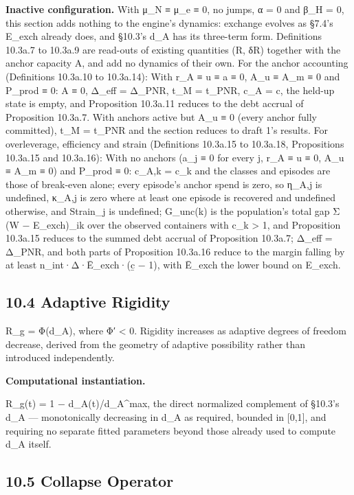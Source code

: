 \documentclass[
]{article}
\begin{document}
\textbf{Inactive configuration.} With μ\_N ≡ μ\_e ≡ 0, no jumps, α = 0
and β\_H = 0, this section adds nothing to the engine's dynamics:
exchange evolves as §7.4's E\_exch already does, and §10.3's d\_A has
its three-term form. Definitions 10.3a.7 to 10.3a.9 are read-outs of
existing quantities (R, δR) together with the anchor capacity A, and add
no dynamics of their own. For the anchor accounting (Definitions
10.3a.10 to 10.3a.14): With r\_A ≡ u ≡ a ≡ 0, A\_u ≡ A\_m ≡ 0 and
P\_prod ≡ 0: A ≡ 0, Δ\_eff = Δ\_PNR, t\_M = t\_PNR, c\_A = c, the
held-up state is empty, and Proposition 10.3a.11 reduces to the debt
accrual of Proposition 10.3a.7. With anchors active but A\_u ≡ 0 (every
anchor fully committed), t\_M = t\_PNR and the section reduces to draft
1's results. For overleverage, efficiency and strain (Definitions
10.3a.15 to 10.3a.18, Propositions 10.3a.15 and 10.3a.16): With no
anchors (a\_j ≡ 0 for every j, r\_A ≡ u ≡ 0, A\_u ≡ A\_m ≡ 0) and
P\_prod ≡ 0: c\_A,k = c\_k and the classes and episodes are those of
break-even alone; every episode's anchor spend is zero, so η\_A,j is
undefined, κ\_A,j is zero where at least one episode is recovered and
undefined otherwise, and Strain\_j is undefined; G\_unc(k) is the
population's total gap Σ (W − E\_exch)\_ik over the observed containers
with c\_k \textgreater{} 1, and Proposition 10.3a.15 reduces to the
summed debt accrual of Proposition 10.3a.7; Δ\_eff = Δ\_PNR, and both
parts of Proposition 10.3a.16 reduce to the margin falling by at least
n\_int·Δ·Ē\_exch·(c̲ − 1), with Ē\_exch the lower bound on E\_exch.

\hypertarget{adaptive-rigidity}{%
\subsection{10.4 Adaptive Rigidity}\label{adaptive-rigidity}}

R\_g = Φ(d\_A), where Φ′ \textless{} 0. Rigidity increases as adaptive
degrees of freedom decrease, derived from the geometry of adaptive
possibility rather than introduced independently.

\textbf{Computational instantiation.}

R\_g(t) = 1 − d\_A(t)/d\_A\^{}max, the direct normalized complement of
§10.3's d\_A --- monotonically decreasing in d\_A as required, bounded
in {[}0,1{]}, and requiring no separate fitted parameters beyond those
already used to compute d\_A itself.

\hypertarget{collapse-operator}{%
\subsection{10.5 Collapse Operator}\label{collapse-operator}}
\end{document}
